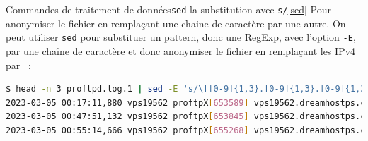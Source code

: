 \documentclass{beamer}
\begin{document}
    \begin{frame}[fragile]{Commandes de traitement de données}{\lstinline{sed} la substitution avec \lstinline{s/}\cref{sed}}
        Pour anonymiser le fichier en remplaçant une chaine de caractère par une autre.
        On peut utiliser \lstinline{sed} pour substituer un pattern, donc une RegExp, avec l'option \lstinline{-E}, par une chaîne de caractère et donc anonymiser le fichier en remplaçant les IPv4 par ~:
        \begin{lstlisting}[language=bash,basicstyle=\tiny\ttfamily]
$ head -n 3 proftpd.log.1 | sed -E 's/\[[0-9]{1,3}.[0-9]{1,3}.[0-9]{1,3}.[0-9]{1,3}\]/[xxx.xxx.xxx.xxx]/g'
2023-03-05 00:17:11,880 vps19562 proftpX[653589] vps19562.dreamhostps.com: ProFTPD 1.3.6c (maint) (built Thu Feb 27 2020 19:34:56 UTC) standalone mode STARTUP
2023-03-05 00:47:51,132 vps19562 proftpX[653845] vps19562.dreamhostps.com (aurora.probe.onyphe.net[xxx.xxx.xxx.xxx]): USER anonymous: no such user found from aurora.probe.onyphe.net [xxx.xxx.xxx.xxx] to~::ffff:66.33.201.239:21
2023-03-05 00:55:14,666 vps19562 proftpX[655268] vps19562.dreamhostps.com (hodson.probe.onyphe.net[xxx.xxx.xxx.xxx]): USER anonymous: no such user found from hodson.probe.onyphe.net [xxx.xxx.xxx.xxx] to~::ffff:66.33.201.239:21
        \end{lstlisting}
    \end{frame}
\end{document}
